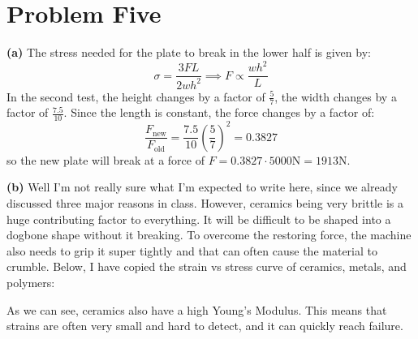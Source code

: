 \documentclass{article}
\begin{document}
    \section*{Problem Five}
    \textbf{(a)}
    The stress needed for the plate to break in the lower half is given by:
    \begin{equation}
        \sigma = \frac{3FL}{2wh^2} \implies F \propto \frac{wh^2}{L}
    \end{equation}
    In the second test, the height changes by a factor of $\frac{5}{7}$, the width changes by a factor of $\frac{7.5}{10}$. Since the length is constant, the force changes by a factor of:
    \begin{equation}
        \frac{F_\text{new}}{F_\text{old}} = \frac{7.5}{10} \left(\frac{5}{7}\right)^2 = 0.3827
    \end{equation}
    so the new plate will break at a force of $F = 0.3827 \cdot 5000 \si{\newton} = \boxed{1913\si{\newton}}$.
    \vspace{2mm}

    \textbf{(b)} Well I'm not really sure what I'm expected to write here, since we already discussed three major reasons in class. However, ceramics being very brittle is a huge contributing factor to everything. It will be difficult to be shaped into a dogbone shape without it breaking. To overcome the restoring force, the machine also needs to grip it super tightly and that can often cause the material to crumble. Below, I have copied the strain vs stress curve of ceramics, metals, and polymers:
    \begin{figure}[ht]
        \centering
    \end{figure}
    As we can see, ceramics also have a high Young's Modulus. This means that strains are often very small and hard to detect, and it can quickly reach failure.
\end{document}
